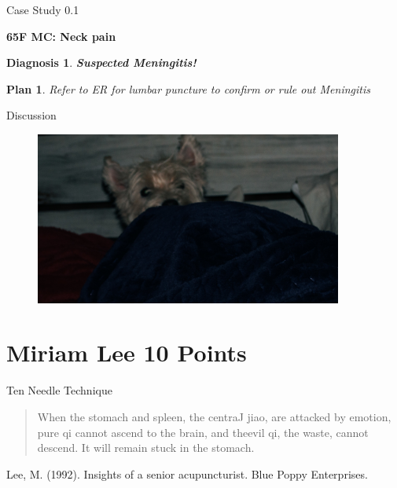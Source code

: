 \begin{frame}{Case Study 0.1} %
  \newtheorem{dx}{Diagnosis}
  \newtheorem{pln}{Plan}
  \textbf{\Large 65F MC: Neck pain}

  \begin{dx}
    \textbf{Suspected Meningitis!}
  \end{dx}

  \begin{pln}
    Refer to ER for lumbar puncture to confirm or rule out Meningitis
  \end{pln}

\end{frame}
  
\begin{frame}{Discussion}
  \begin{figure}
    \centering
    \includegraphics[width=0.9\textwidth]{img/westie02.jpg}
  \end{figure}
\end{frame}

\section{Miriam Lee 10 Points}

\begin{frame}{Ten Needle Technique}
\begin{quote}
When the stomach and spleen, the centraJ jiao, are attacked by emotion, pure qi cannot ascend to the brain, and theevil qi, the waste, cannot descend. It will remain stuck in the stomach.
\end{quote}

Lee, M. (1992). Insights of a senior acupuncturist. Blue Poppy Enterprises. 

\end{frame}

